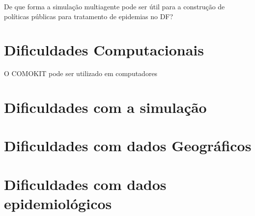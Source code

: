 
De que forma a simulação multiagente pode ser útil para a construção de políticas públicas para tratamento de epidemias no DF?

\section{Dificuldades Computacionais}

O COMOKIT pode ser utilizado em computadores 


\section{Dificuldades com a  simulação}
\section{Dificuldades com dados Geográficos}
\section{Dificuldades com dados epidemiológicos}


